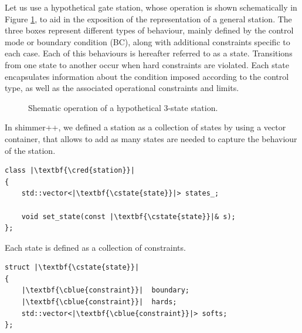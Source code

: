 


Let us use a hypothetical gate station, whose operation is shown schematically in Figure \ref{fig: schematic_remi}, to aid in the exposition of the representation of a general station. The three boxes represent different types of behaviour, mainly defined by the control mode or boundary condition (BC), along with additional constraints specific to each case. Each of this behaviours is hereafter referred to as a state.  Transitions from one state to another occur when hard constraints are violated. Each state encapsulates information about the condition imposed according to the control type,  as well as the associated operational constraints and limits.
\begin{figure}[H]
	\centering
	
    \caption{Shematic operation of a hypothetical 3-state station.}
    \label{fig: schematic_remi}
\end{figure}
In shimmer++, we defined a station as a collection of states by using a vector container, that allows to add as many states are needed to capture the behaviour of the station.
\begin{verbatim}
class |\textbf{\cred{station}}|
{
    std::vector<|\textbf{\cstate{state}}|> states_;

    void set_state(const |\textbf{\cstate{state}}|& s);   
};
\end{verbatim}
Each state is defined as a collection of constraints. 
\begin{verbatim}
struct |\textbf{\cstate{state}}|
{
    |\textbf{\cblue{constraint}}|  boundary;  
    |\textbf{\cblue{constraint}}|  hards;
    std::vector<|\textbf{\cblue{constraint}}|> softs;
};
\end{verbatim}


